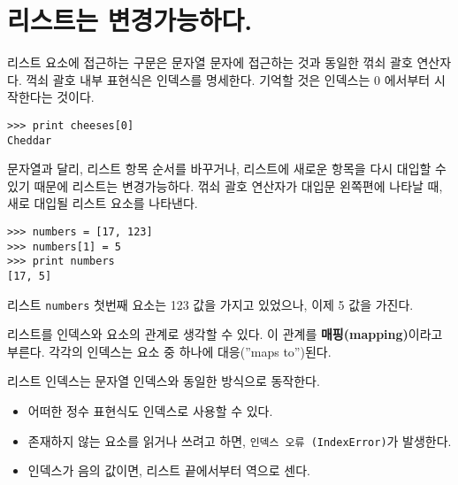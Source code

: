 
\section{리스트는 변경가능하다.}


리스트 요소에 접근하는 구문은 문자열 문자에 접근하는 것과 동일한 꺾쇠 괄호 연산자다.
꺽쇠 괄호 내부 표현식은 인덱스를 명세한다. 기억할 것은 인덱스는 0 에서부터 시작한다는 것이다.

\beforeverb
\begin{verbatim}
>>> print cheeses[0]
Cheddar
\end{verbatim}
\afterverb
%

문자열과 달리, 리스트 항목 순서를 바꾸거나, 리스트에 새로운 항목을 다시 대입할 수 있기 때문에 리스트는 변경가능하다.
꺾쇠 괄호 연산자가 대입문 왼쪽편에 나타날 때, 새로 대입될 리스트 요소를 나타낸다.


\beforeverb
\begin{verbatim}
>>> numbers = [17, 123]
>>> numbers[1] = 5
>>> print numbers
[17, 5]
\end{verbatim}
\afterverb
%

리스트 {\tt numbers} 첫번째 요소는 123 값을 가지고 있었으나, 이제 5 값을 가진다.


리스트를 인덱스와 요소의 관계로 생각할 수 있다. 
이 관계를 {\bf 매핑(mapping)}이라고 부른다. 
각각의 인덱스는 요소 중 하나에 대응(''maps to'')된다.


리스트 인덱스는 문자열 인덱스와 동일한 방식으로 동작한다.

\begin{itemize}

\item 어떠한 정수 표현식도 인덱스로 사용할 수 있다.

\item 존재하지 않는 요소를 읽거나 쓰려고 하면, {\tt 인덱스 오류 (IndexError)}가 발생한다.


\item 인덱스가 음의 값이면, 리스트 끝에서부터 역으로 센다.

\end{itemize}

